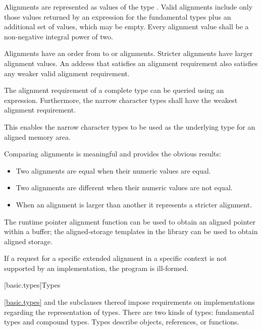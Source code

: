 \pnum
Alignments are represented as values of the type .
Valid alignments include only those values returned by an 
expression for the fundamental types plus an additional 
set of values, which may be empty.
Every alignment value shall be a non-negative integral power of two.

\pnum
Alignments have an order from  to
 or  alignments. Stricter
alignments have larger alignment values. An address that satisfies an alignment
requirement also satisfies any weaker valid alignment requirement.

\pnum
The alignment requirement of a complete type can be queried using an
 expression. Furthermore,
the narrow character types shall have the weakest
alignment requirement.
\begin{note} This enables the narrow character types to be used as the
underlying type for an aligned memory area.\end{note}

\pnum
Comparing alignments is meaningful and provides the obvious results:

\begin{itemize}
\item Two alignments are equal when their numeric values are equal.
\item Two alignments are different when their numeric values are not equal.
\item When an alignment is larger than another it represents a stricter alignment.
\end{itemize}

\pnum
\begin{note} The runtime pointer alignment function
can be used to obtain an aligned pointer within a buffer; the aligned-storage templates
in the library can be used to obtain aligned storage.
\end{note}

\pnum
If a request for a specific extended alignment in a specific context is not
supported by an implementation, the program is ill-formed.

[basic.types]{Types}%

\pnum
\begin{note}
\ref{basic.types} and the subclauses thereof
impose requirements on implementations regarding the representation
of types.
There are two kinds of types: fundamental types and compound types.
Types describe objects,
references,
or functions.
\end{note}

